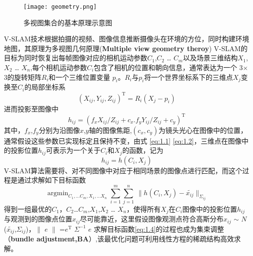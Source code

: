 \begin{figure}[!htbp]
\centering
\texttt{[image: geometry.png]}
\caption{多视图集合的基本原理示意图}
\label{fig:MVGeometry}
\end{figure}
V-SLAM技术根据拍摄的视频、图像信息推断摄像头在环境的方位，同时构建环境地图，其原理为多视图几何原理(\textbf{Multiple view geometry theroy}\cite{Hartley2004}) V-SLAM的目标为同时恢复出每帧图像对应的相机运动参数$C_1$,$C_2$ … $C_m$以及场景三维结构$X_1$,$X_2$ … $X_n$,每个相机运动参数$C_i$包含了相机的位置和朝向信息，通常表达为一个 3$\times$3的旋转矩阵$R_i$和一个三维位置变量 $p_i$。$R_i$与$p_i$将一个世界坐标系下的三维点$X_j$变换至$C_i$的局部坐标系
\begin{equation}\label{eq:1.1}
{(X_{ij},Y_{ij},Z_{ij})}^\mathrm{T}=R_{i}(X_{j}-p_{i})
\end{equation}
进而投影至图像中
\begin{equation}\label{eq:1.2}
h_{ij}={(f_{x}X_{ij}/Z_{ij}+c_{x}.f_{y}Y_{ij}/Z_{ij}+c_{y})}^\mathrm{T}
\end{equation}
其中，$f_x$,$f_y$分别为沿图像$x$,$y$轴的图像焦距,$(c_x,c_y)$为镜头光心在图像中的位置，通常假设这些参数已实现标定且保持不变，由式
\autoref{eq:1.1} \autoref{eq:1.2}，三维点在图像中的投影位置$h_{ij}$可表示为一个关于$C_i$和$X_j$的函数，记为
\begin{equation}\label{eq:1.3}
h_{ij}=h(C_i,X_j)
\end{equation}
V-SLAM算法需要将、对不同图像中对应于相同场景的图像点进行匹配，而这个过程是通过求解如下目标函数
\begin{equation}\label{eq:1.4}
\mathop{\arg\min}_{C_1,…C_m,X_1,…X_n} \sum_{i=1}^{m} {\sum_{j=1}^{n} \ \| {h} (C_i,X_j)-\tilde{x_{ij}}\|_{\Sigma_{ij}}}
\end{equation}
得到一组最优的$C_1$，$C_2$…$C_m$,$X_1$,$X_2$ … $X_n$，使得所有$X_j$在$C_i$图像中的投影位置$h_{ij}$与观测到的图像点位置$x_{ij}$尽可能靠近，这里假设图像观测点符合高斯分布$x_{ij}$ $\sim$ $\mathrm{\textit{N}}$ ($\tilde{x_{ij}}$,$\Sigma_{ij}$)，$\|$ $e$ $\|$ =$e^{\mathrm{T}}$ $\Sigma^{-1}$ $e$
求解目标函数\autoref{eq:1.4}的过程也成为集束调整（\textbf{bundle adjustment,BA}）,该最优化问题可利用线性方程的稀疏结构高效求解。
